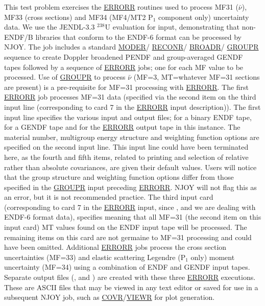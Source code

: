 This test problem exercises the \hyperlink{sERRORRhy}{ERRORR}
routines used to process MF31 ($\bar{\nu}$), MF33 (cross sections)
and MF34 (MF4/MT2 P$_1$ component only) uncertainty
data.  We use the JENDL-3.3 $^{238}$U evaluation
for input, demonstrating that non-ENDF/B libraries that conform to
the ENDF-6 format can be processed by NJOY.  The job includes a
standard \hyperlink{sMODERhy}{MODER}/
\hyperlink{sRECONRhy}{RECONR}/
\hyperlink{sBROADRhy}{BROADR}/
\hyperlink{sGROUPRhy}{GROUPR} sequence to create Doppler
broadened PENDF and group-averaged GENDF tapes followed by a
sequence of \hyperlink{sERRORRhy}{ERRORR} jobs; one for each
MF value to be processed.  Use of \hyperlink{sGROUPRhy}{GROUPR}
to process $\bar{\nu}$ (MF=3, MT=whatever MF=31 sections are
present) is a pre-requisite for MF=31 processing with
\hyperlink{sERRORRhy}{ERRORR}.  The first
\hyperlink{sERRORRhy}{ERRORR} job processes MF=31 data
(specified via the second item on the third input line
(corresponding to card 7 in the
\hyperlink{sERRORRhy}{ERRORR} input
description)).  The first input line specifies the various input and
output files;  for a binary ENDF tape, 
for a GENDF tape and  for the
\hyperlink{sERRORRhy}{ERRORR} output tape in
this instance.  The material number, multigroup energy structure and
weighting function options are specified on the second input line.
This input line could have been terminated here, as the fourth and
fifth items, related to printing and selection of relative rather than
absolute covariances, are given their default values.  Users will
notice that the group structure and weighting function options differ
from those specified in the
\hyperlink{sGROUPRhy}{GROUPR} input preceding
\hyperlink{sERRORRhy}{ERRORR}.  NJOY will
not flag this as an error, but it is not recommended practice.  The
third input card (corresponding to card 7 in the
\hyperlink{sERRORRhy}{ERRORR} input, since
, and we are dealing with ENDF-6 format data),
specifies  meaning that all MF=31 (the second item on
this input card) MT values found on the ENDF input tape will be
processed.  The remaining items on this card are not germaine to
MF=31 processing and could have been omitted.  Additional
\hyperlink{sERRORRhy}{ERRORR} jobs process the cross section
uncertainties (MF=33) and elastic scattering Legendre (P$_1$ only)
moment uncertainty (MF=34) using a combination of ENDF and GENDF
input tapes.  Separate output files (, 
and ) are created with these three
\hyperlink{sERRORRhy}{ERRORR} executions.  These are ASCII files
that may be viewed in any text editor or saved for use in a
subsequent NJOY job, such as
\hyperlink{sCOVRhy}{COVR}/\hyperlink{sVIEWRhy}{VIEWR} for
plot generation.

